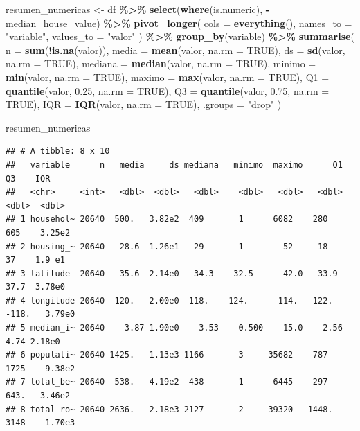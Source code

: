 \documentclass[
]{book}
\newenvironment{Shaded}{\begin{snugshade}}{\end{snugshade}}
\newcommand{\AttributeTok}[1]{\textcolor[rgb]{0.13,0.29,0.53}{#1}}
\newcommand{\ConstantTok}[1]{\textcolor[rgb]{0.56,0.35,0.01}{#1}}
\newcommand{\FloatTok}[1]{\textcolor[rgb]{0.00,0.00,0.81}{#1}}
\newcommand{\FunctionTok}[1]{\textcolor[rgb]{0.13,0.29,0.53}{\textbf{#1}}}
\newcommand{\NormalTok}[1]{#1}
\newcommand{\OtherTok}[1]{\textcolor[rgb]{0.56,0.35,0.01}{#1}}
\newcommand{\SpecialCharTok}[1]{\textcolor[rgb]{0.81,0.36,0.00}{\textbf{#1}}}
\newcommand{\StringTok}[1]{\textcolor[rgb]{0.31,0.60,0.02}{#1}}
\begin{document}
\begin{Shaded}
\begin{Highlighting}[]
\NormalTok{resumen\_numericas }\OtherTok{\textless{}{-}}\NormalTok{ df }\SpecialCharTok{\%\textgreater{}\%}
  \FunctionTok{select}\NormalTok{(}\FunctionTok{where}\NormalTok{(is.numeric), }\SpecialCharTok{{-}}\NormalTok{median\_house\_value) }\SpecialCharTok{\%\textgreater{}\%}
  \FunctionTok{pivot\_longer}\NormalTok{(}
    \AttributeTok{cols =} \FunctionTok{everything}\NormalTok{(),}
    \AttributeTok{names\_to =} \StringTok{"variable"}\NormalTok{,}
    \AttributeTok{values\_to =} \StringTok{"valor"}
\NormalTok{  ) }\SpecialCharTok{\%\textgreater{}\%}
  \FunctionTok{group\_by}\NormalTok{(variable) }\SpecialCharTok{\%\textgreater{}\%}
  \FunctionTok{summarise}\NormalTok{(}
    \AttributeTok{n =} \FunctionTok{sum}\NormalTok{(}\SpecialCharTok{!}\FunctionTok{is.na}\NormalTok{(valor)),}
    \AttributeTok{media =} \FunctionTok{mean}\NormalTok{(valor, }\AttributeTok{na.rm =} \ConstantTok{TRUE}\NormalTok{),}
    \AttributeTok{ds =} \FunctionTok{sd}\NormalTok{(valor, }\AttributeTok{na.rm =} \ConstantTok{TRUE}\NormalTok{),}
    \AttributeTok{mediana =} \FunctionTok{median}\NormalTok{(valor, }\AttributeTok{na.rm =} \ConstantTok{TRUE}\NormalTok{),}
    \AttributeTok{minimo =} \FunctionTok{min}\NormalTok{(valor, }\AttributeTok{na.rm =} \ConstantTok{TRUE}\NormalTok{),}
    \AttributeTok{maximo =} \FunctionTok{max}\NormalTok{(valor, }\AttributeTok{na.rm =} \ConstantTok{TRUE}\NormalTok{),}
    \AttributeTok{Q1 =} \FunctionTok{quantile}\NormalTok{(valor, }\FloatTok{0.25}\NormalTok{, }\AttributeTok{na.rm =} \ConstantTok{TRUE}\NormalTok{),}
    \AttributeTok{Q3 =} \FunctionTok{quantile}\NormalTok{(valor, }\FloatTok{0.75}\NormalTok{, }\AttributeTok{na.rm =} \ConstantTok{TRUE}\NormalTok{),}
    \AttributeTok{IQR =} \FunctionTok{IQR}\NormalTok{(valor, }\AttributeTok{na.rm =} \ConstantTok{TRUE}\NormalTok{),}
    \AttributeTok{.groups =} \StringTok{"drop"}
\NormalTok{  )}

\NormalTok{resumen\_numericas}
\end{Highlighting}
\end{Shaded}

\begin{verbatim}
## # A tibble: 8 x 10
##   variable      n   media     ds mediana   minimo  maximo      Q1      Q3    IQR
##   <chr>     <int>   <dbl>  <dbl>   <dbl>    <dbl>   <dbl>   <dbl>   <dbl>  <dbl>
## 1 househol~ 20640  500.   3.82e2  409       1      6082    280     605    3.25e2
## 2 housing_~ 20640   28.6  1.26e1   29       1        52     18      37    1.9 e1
## 3 latitude  20640   35.6  2.14e0   34.3    32.5      42.0   33.9    37.7  3.78e0
## 4 longitude 20640 -120.   2.00e0 -118.   -124.     -114.  -122.   -118.   3.79e0
## 5 median_i~ 20640    3.87 1.90e0    3.53    0.500    15.0    2.56    4.74 2.18e0
## 6 populati~ 20640 1425.   1.13e3 1166       3     35682    787    1725    9.38e2
## 7 total_be~ 20640  538.   4.19e2  438       1      6445    297     643.   3.46e2
## 8 total_ro~ 20640 2636.   2.18e3 2127       2     39320   1448.   3148    1.70e3
\end{verbatim}
\end{document}
